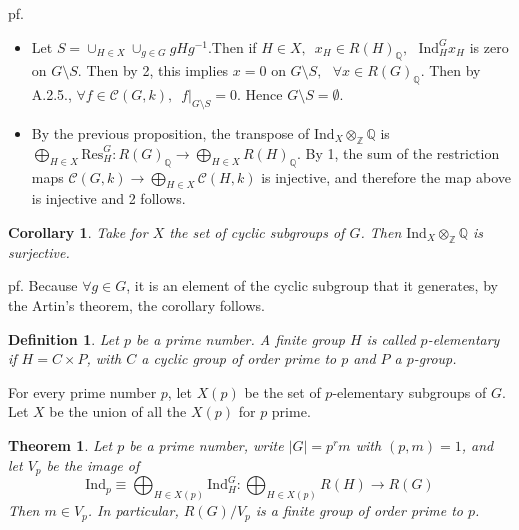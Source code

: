\documentclass[12pt,letterpaper]{report}
\newtheorem{definition}{Definition}[section]
\newtheorem{theorem}{Theorem}[section]
\newtheorem{corollary}{Corollary}[section]
\begin{document}
pf.\begin{itemize}\item Let $S=\cup_{H\in X}\cup_{g\in G}gHg^{-1}$.Then if $H\in X,\,\,\,x_{H}\in R(H)_{\mathbb{Q}},\,\,\,\,\text{Ind}_{H}^{G}x_{H}$ is zero on $G\setminus S$. Then by 2, this implies $x=0$ on $G\setminus S,\,\,\,\,\forall x\in R(G)_{\mathbb{Q}}$. Then by A.2.5., $\forall f\in\mathcal{C}(G,k),\,\,\,f|_{G\setminus S}=0$. Hence $G\setminus S=\emptyset$.
\item By the previous proposition, the transpose of $\text{Ind}_{X}\otimes_{\mathbb{Z}}\mathbb{Q}$ is $\bigoplus_{H\in X}\text{Res}_{H}^{G}:R(G)_{\mathbb{Q}}\rightarrow\bigoplus_{H\in X}R(H)_{\mathbb{Q}}$. By 1, the sum of the restriction maps $\mathcal{C}(G,k)\rightarrow\bigoplus_{H\in X}\mathcal{C}(H,k)$ is injective, and therefore the map above is injective and 2 follows.  


\end{itemize}
\begin{corollary}Take for $X$ the set of cyclic subgroups of $G$. Then $\text{Ind}_{X}\otimes_{\mathbb{Z}}\mathbb{Q}$ is surjective.\end{corollary}
pf. Because $\forall g\in G$, it is an element of the cyclic subgroup that it generates, by the Artin's theorem, the corollary follows. 
\begin{definition}Let $p$ be a prime number. A finite group $H$ is called $p$-elementary if $H=C\times P$, with $C$ a cyclic group of order prime to $p$ and $P$ a $p$-group.\end{definition}
For every prime number $p$, let $X(p)$ be the set of $p$-elementary subgroups of $G$. Let $X$ be the union of all the $X(p)$ for $p$ prime.
\begin{theorem}Let $p$ be a prime number, write $|G|=p^{r}m$ with $(p,m)=1$, and let $V_{p}$ be the image of \begin{equation*}\text{Ind}_{p}\equiv\bigoplus_{H\in X(p)}\text{Ind}_{H}^{G}:\bigoplus_{H\in X(p)}R(H)\rightarrow R(G)\end{equation*} Then $m\in V_{p}$. In particular, $R(G)/V_{p}$ is a finite group of order prime to $p$.\end{theorem}
\end{document}
